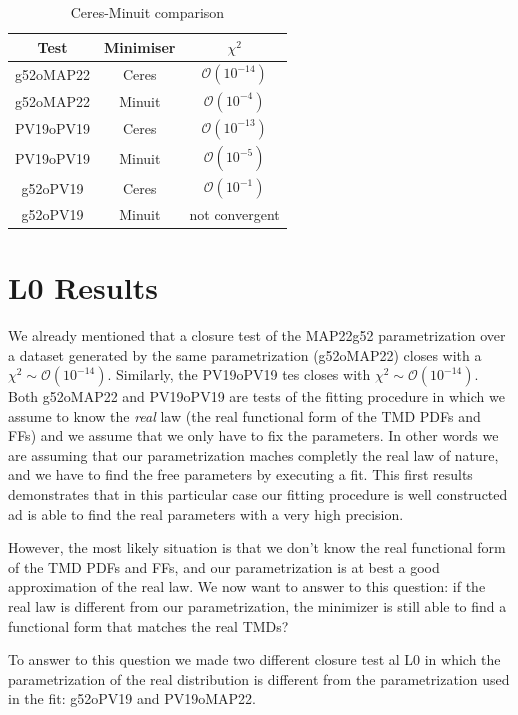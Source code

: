 \documentclass[12pt]{report}
\begin{document}
\begin{table}[h]
    \caption{Ceres-Minuit comparison}
    \label{tab:CeresVsMinuit}
    \centering
   \begin{tabular}{|c|c|c|}
    \hline
    \textbf{Test} & \textbf{Minimiser} & $\chi^2$ \\
    \hline
    g52oMAP22 & Ceres & $\mathcal{O}(10^{-14})$ \\
    g52oMAP22 & Minuit & $\mathcal{O}(10^{-4})$ \\
    PV19oPV19 & Ceres & $\mathcal{O}(10^{-13})$ \\
    PV19oPV19 & Minuit & $\mathcal{O}(10^{-5})$ \\
    g52oPV19 & Ceres & $\mathcal{O}(10^{-1})$ \\
    g52oPV19 & Minuit & not convergent \\
    \hline
\end{tabular}
\end{table}

\section{L0 Results}

We already mentioned that a closure test of the MAP22g52 parametrization over a dataset generated by the same parametrization (g52oMAP22) closes with a $\chi^2\sim \mathcal{O}(10^{-14})$. Similarly, the PV19oPV19 tes closes with  $\chi^2\sim \mathcal{O}(10^{-14})$. Both g52oMAP22 and PV19oPV19 are tests of the fitting procedure in which we assume to know the \textit{real} law (the real functional form of the TMD PDFs and FFs) and we assume that we only have to fix the parameters. In other words we are assuming that our parametrization maches completly the real law of nature, and we have to find the free parameters by executing a fit. This first results demonstrates that in this particular case our fitting procedure is well constructed ad is able to find the real parameters with a very high precision.

However, the most likely situation is that we don't know the real functional form of the TMD PDFs and FFs, and our parametrization is at best a good approximation of the real law. We now want to answer to this question: if the real law is different from our parametrization, the minimizer is still able to find a functional form that matches the real TMDs? 

To answer to this question we made two different closure test al L0 in which the parametrization of the real distribution is different from the parametrization used in the fit: g52oPV19 and PV19oMAP22.
\end{document}
